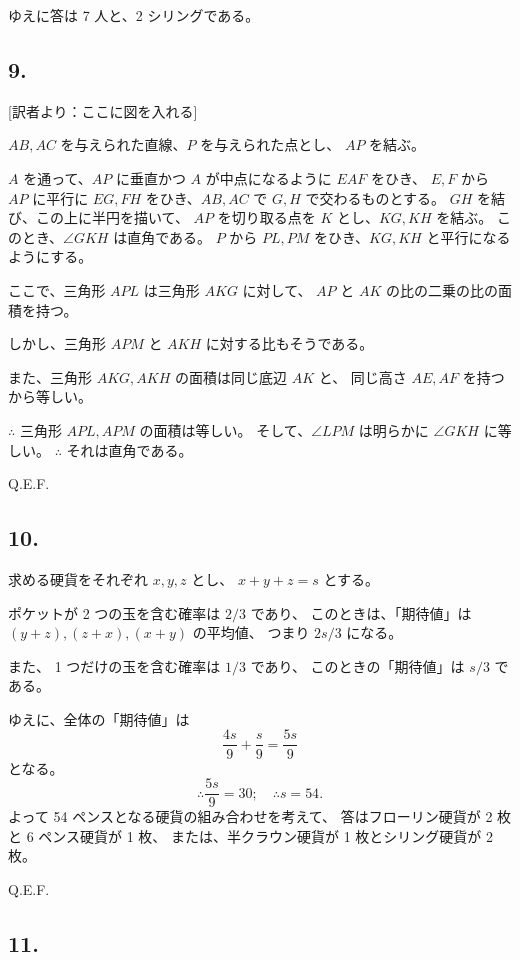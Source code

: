 ゆえに答は 7 人と、2 シリングである。

\subsection*{9.}

[訳者より：ここに図を入れる]

$AB, AC$ を与えられた直線、$P$ を与えられた点とし、
$AP$ を結ぶ。

$A$ を通って、$AP$ に垂直かつ $A$ が中点になるように $EAF$ をひき、
$E, F$ から $AP$ に平行に $EG, FH$ をひき、$AB, AC$
で $G, H$ で交わるものとする。
$GH$ を結び、この上に半円を描いて、
$AP$ を切り取る点を $K$ とし、$KG, KH$ を結ぶ。
このとき、$\angle GKH$ は直角である。
$P$ から $PL, PM$ をひき、$KG, KH$ と平行になるようにする。

ここで、三角形 $APL$ は三角形 $AKG$ に対して、
$AP$ と $AK$ の比の二乗の比の面積を持つ。

しかし、三角形 $APM$ と $AKH$ に対する比もそうである。

また、三角形 $AKG, AKH$ の面積は同じ底辺 $AK$ と、
同じ高さ $AE, AF$ を持つから等しい。

$\therefore$ 三角形 $APL, APM$ の面積は等しい。
そして、$\angle LPM$ は明らかに $\angle GKH$ に等しい。
$\therefore$ それは直角である。

Q.E.F.

\subsection*{10.}

求める硬貨をそれぞれ $x, y, z$ とし、
$x + y + z = s$ とする。

ポケットが 2 つの玉を含む確率は $2/3$ であり、
このときは、「期待値」は
$(y + z), (z + x), (x + y)$ の平均値、
つまり $2 s /3$ になる。

また、 1 つだけの玉を含む確率は $1/3$ であり、
このときの「期待値」は $s/3$ である。

ゆえに、全体の「期待値」は
\[
\frac{4s}{9} + \frac{s}{9} = \frac{5s}{9}
\]
となる。
\[
\therefore \frac{5s}{9} = 30;
\quad \therefore s = 54.
\]
よって 54 ペンスとなる硬貨の組み合わせを考えて、
答はフローリン硬貨が 2 枚と 6 ペンス硬貨が 1 枚、
または、半クラウン硬貨が 1 枚とシリング硬貨が 2 枚。

Q.E.F.

\subsection*{11.}


